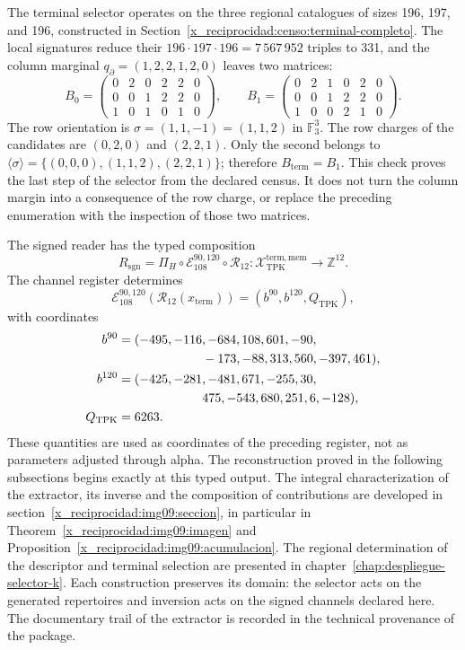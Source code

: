 The terminal selector operates on the three regional catalogues
of sizes 196, 197, and 196, constructed in
Section~\ref{x_reciprocidad:censo:terminal-completo}. The local signatures reduce their
\(196\cdot197\cdot196=7\,567\,952\) triples to 331, and the column
marginal \(q_{\partial}=(1,2,2,1,2,0)\) leaves two matrices:
\[
 B_0=\begin{pmatrix}0&2&0&2&2&0\\0&0&1&2&2&0\\1&0&1&0&1&0\end{pmatrix},
 \qquad
 B_1=\begin{pmatrix}0&2&1&0&2&0\\0&0&1&2&2&0\\1&0&0&2&1&0\end{pmatrix}.
\]
The row orientation is \(\sigma=(1,1,-1)=(1,1,2)\) in
\(\mathbb F_3^3\). The row charges of the candidates are
\((0,2,0)\) and \((2,2,1)\). Only the second belongs to
\(\langle\sigma\rangle=\{(0,0,0),(1,1,2),(2,2,1)\}\); therefore
\(B_{\mathrm{term}}=B_1\). This check proves the last step of the
selector from the declared census. It does not turn the column margin
into a consequence of the row charge, or replace the preceding enumeration
with the inspection of those two matrices.

The signed reader has the typed composition
\begin{equation}
 R_{\mathrm{sgn}}
 =\Pi_H\circ\mathcal E_{108}^{90,120}\circ\mathcal R_{12}:
 \mathcal X_{\mathrm{TPK}}^{\mathrm{term,mem}}
 \longrightarrow\mathbb Z^{12}.
 \label{x_reciprocidad:eq:k-lector-firmado}
\end{equation}
The channel register determines
\[
 \mathcal E_{108}^{90,120}(\mathcal R_{12}(x_{\mathrm{term}}))
 =(b^{90},b^{120},Q_{\mathrm{TPK}}),
\]
with coordinates
\begin{align*}
 b^{90}={}&(-495,-116,-684,108,601,-90,\\
            &\hspace{19mm}-173,-88,313,560,-397,461),\\
 b^{120}={}&(-425,-281,-481,671,-255,30,\\
             &\hspace{19mm}475,-543,680,251,6,-128),\\
 Q_{\mathrm{TPK}}={}&6263.
\end{align*}
These quantities are used as coordinates of the preceding register, not
as parameters adjusted through alpha. The reconstruction proved
in the following subsections begins exactly at this typed output.
The integral characterization of the extractor, its inverse and the composition
of contributions are developed in section~\ref{x_reciprocidad:img09:seccion},
in particular in Theorem~\ref{x_reciprocidad:img09:imagen} and
Proposition~\ref{x_reciprocidad:img09:acumulacion}. The regional determination
of the descriptor and terminal selection are presented in
chapter~\ref{chap:despliegue-selector-k}. Each construction preserves its
domain: the selector acts on the generated repertoires and inversion
acts on the signed channels declared here. The documentary trail of the
extractor is recorded in the technical provenance of the package.

